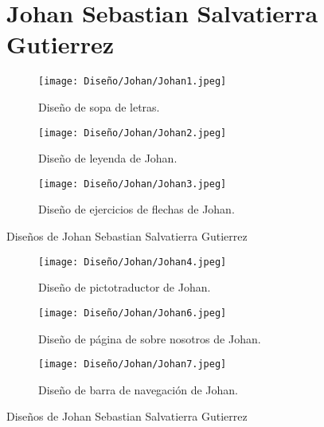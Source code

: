 \begin{figure}[h!]
  \section{Johan Sebastian Salvatierra Gutierrez}
  \begin{subfigure}{\textwidth}
    \centering
    \texttt{[image: Diseño/Johan/Johan1.jpeg]}
    \caption{Diseño de sopa de letras.}
    \label{Johan1}
  \end{subfigure}

  \begin{subfigure}{\textwidth}
    \centering
    \texttt{[image: Diseño/Johan/Johan2.jpeg]}
    \caption{Diseño de leyenda de Johan.}
    \label{Johan2}
  \end{subfigure}

  \begin{subfigure}{\textwidth}
    \centering
    \texttt{[image: Diseño/Johan/Johan3.jpeg]}
    \caption{Diseño de ejercicios de flechas de Johan.}
    \label{Johan3}
  \end{subfigure}

  \caption{Diseños de Johan Sebastian Salvatierra Gutierrez}
  \label{fig:disenyoJohan}
\end{figure}

\begin{figure}[h!]
  \ContinuedFloat
  \begin{subfigure}{\textwidth}
    \centering
    \texttt{[image: Diseño/Johan/Johan4.jpeg]}
    \caption{Diseño de pictotraductor de Johan.}
    \label{Johan4}
  \end{subfigure}
  
  \begin{subfigure}{\textwidth}
    \centering
    \texttt{[image: Diseño/Johan/Johan6.jpeg]}
    \caption{Diseño de página de sobre nosotros de Johan.}
    \label{Johan6}
  \end{subfigure}
  
  \begin{subfigure}{\textwidth}
    \centering
    \texttt{[image: Diseño/Johan/Johan7.jpeg]}
    \caption{Diseño de barra de navegación de Johan.}
    \label{Johan7}
  \end{subfigure}

  \caption{Diseños de Johan Sebastian Salvatierra Gutierrez}
  \label{fig:disenyoJohan}
\end{figure}

